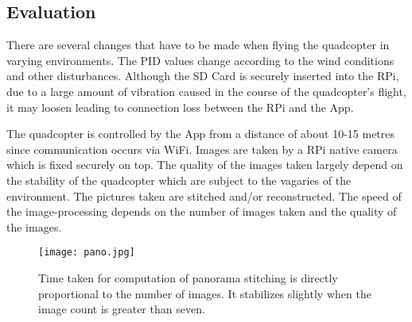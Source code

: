 \subsection{Evaluation}
There are several changes that have to be made when flying the quadcopter in varying environments. The PID values change according to the wind conditions and other disturbances. Although the SD Card is securely inserted into the RPi, due to a large amount of vibration caused in the course of the quadcopter's flight, it may loosen leading to connection loss between the RPi and the App. 
\par
The quadcopter is controlled by the App from a distance of about 10-15 metres since communication occurs via WiFi. Images are taken by a RPi native camera which is fixed securely on top. The quality of the images taken largely depend on the stability of the quadcopter which are subject to the vagaries of the environment.
The pictures taken are stitched and/or reconstructed. The speed of the image-processing depends on the number of images taken and the quality of the images. 
\begin{figure}[H]
  \centering
  \texttt{[image: pano.jpg]}
  \caption{Time taken for computation of panorama stitching is directly proportional to the number of images. It stabilizes slightly when the image count is greater than seven.}
  \label{panorama stitching time graph} 
\end{figure}

